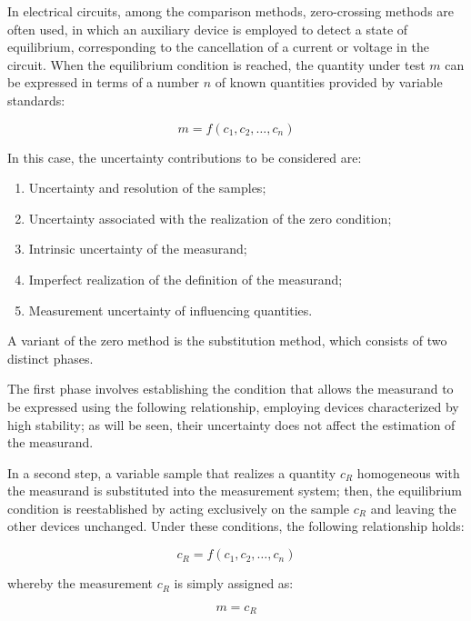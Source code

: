 \documentclass[../main.tex]{subfiles}
\begin{document}
In electrical circuits, among the comparison methods, zero-crossing methods are often used, in which an auxiliary device is employed to detect a state of equilibrium, corresponding to the cancellation of a current or voltage in the circuit.  When the equilibrium condition is reached, the quantity under test $m$ can be expressed in terms of a number $n$ of known quantities provided by variable standards:

\begin{equation}
	m = f(c_1,c_2,\dots,c_n)
\end{equation}

In this case, the uncertainty contributions to be considered are:

\begin{enumerate}
	\item[\textbf{-}] Uncertainty and resolution of the samples;
	\item[\textbf{-}] Uncertainty associated with the realization of the zero condition;
	\item[\textbf{-}] Intrinsic uncertainty of the measurand;
	\item[\textbf{-}] Imperfect realization of the definition of the measurand;
	\item[\textbf{-}] Measurement uncertainty of influencing quantities.
\end{enumerate}


A variant of the zero method is the substitution method, which consists of two distinct phases.  

The first phase involves establishing the condition that allows the measurand to be expressed using the following relationship, employing devices characterized by high stability; as will be seen, their uncertainty does not affect the estimation of the measurand. 

In a second step, a variable sample that realizes a quantity $c_R$ homogeneous with the measurand is substituted into the measurement system; then, the equilibrium condition is reestablished by acting exclusively on the sample $c_R$ and leaving the other devices unchanged. Under these conditions, the following relationship holds:

\begin{equation}
	c_R = f(c_1,c_2,\dots,c_n)
\end{equation}

whereby the measurement $c_R$ is simply assigned as:

\begin{equation}
	m = c_R
\end{equation}
\end{document}
